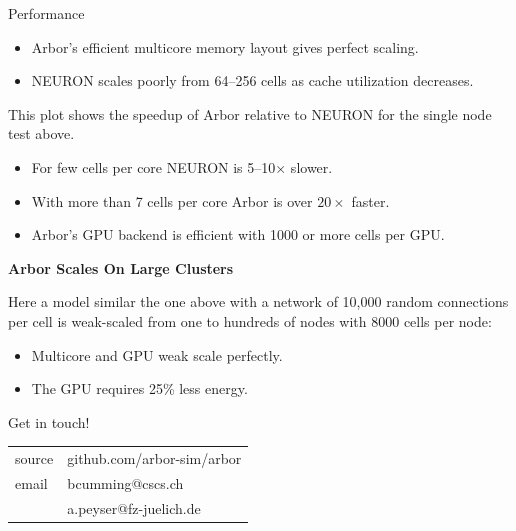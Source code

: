 \documentclass[a0paper,portrait]{baposter}
\newcommand{\arborname}{Arbor\xspace}
\newcommand{\arbor}{{\textcolor{blue!30!black}{\arborname}}\xspace}
\newcommand{\arboremph}{{\textcolor{emph!70!black}{\arborname}}\xspace}
\newcommand{\imageheader}[1]{\begin{center}\bfseries\large{#1}\end{center} \vspace{-2pt}}
\newcommand\neuron{{\relsize{-2}NEURON}\xspace}
\newcommand{\newemph}[1]{{\color{emph}#1}}
\begin{document}
\begin{poster}
\begin{posterbox}[name=plots,column=2,row=0,span=1]{Performance}
    { \small
    \begin{itemize}
        \item \arbor's efficient multicore memory layout gives perfect scaling.
        \item \neuron scales poorly from 64--256 cells as cache utilization decreases.
    \end{itemize}
    }

    \vskip8pt

    This plot shows the \newemph{speedup of \arboremph relative to \neuron} for the single node test above.

    \vskip8pt
    

    { \small
        \begin{itemize}
        \item For few cells per core \neuron is 5--10$\times$ slower.
        \item With more than 7 cells per core \arbor is over $20\times$ faster.
        \item \arbor's GPU backend is efficient with 1000 or more cells per GPU.
        \end{itemize}
    }

    \imageheader{\arbor Scales On Large Clusters}
    \vspace{-5pt}
    { \small
        Here a model similar the one above with a network of 10,000 random connections per cell is weak-scaled from one to hundreds of nodes with 8000 cells per node:
    }
    \vskip8pt
    

    { \small
        \begin{itemize}
        \item Multicore and GPU weak scale perfectly.
        \item The GPU requires 25\% less energy.
        \end{itemize}
    }
\end{posterbox}
\begin{posterbox}[name=contact,column=2,below=plots,span=1,headerColorOne=blue!40!black,headerFontColor=white]{Get in touch!}
    \centering

    \colorbox[HTML]{FCF3CF}{%
        \begin{tabularx}{0.95\textwidth}{l|X}
            source& {github.com/arbor-sim/arbor}\smallskip\\
            email & {bcumming@cscs.ch}\\
                  & {a.peyser@fz-juelich.de}\smallskip\\
        \end{tabularx}
    }
\end{posterbox}

\end{poster}
\end{document}
